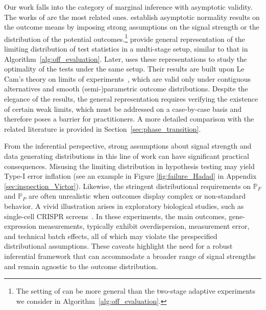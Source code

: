 \documentclass[12pt]{article}
\begin{document}
Our work falls into the category of marginal inference with asymptotic validity. The works of \citet{Zhang2020,Hadad2021,adusumilli2023optimal,Hirano2023} are the most related ones. \citet{Zhang2020,Hadad2021} establish asymptotic normality results on the outcome means by imposing strong assumptions on the signal strength or the distribution of the potential outcomes.\footnote{The setting of \citet{Zhang2020,Hadad2021} can be more general than the two-stage adaptive experiments we consider in Algorithm~\ref{alg:off_evaluation}.} \citet{Hirano2023} provide general representation of the limiting distribution of test statistics 
in a multi-stage setup, similar to that in Algorithm~\ref{alg:off_evaluation}. Later, \citet{adusumilli2023optimal} uses these representations to study the optimality of the tests under the same setup. Their results are built upon Le Cam's theory on limits of experiments~\citep{le1972limits}, 
which are valid only under contiguous alternatives and smooth (semi-)parametric outcome distributions. Despite the elegance of the results, the general representation requires verifying the existence of certain weak limits, which must be addressed on a case-by-case basis and therefore poses a barrier for practitioners. A more detailed comparison with the related literature is provided in Section~\ref{sec:phase_transition}.

From the inferential perspective, strong assumptions about signal strength and data generating distributions in this line of work can have significant practical consequences. 
Misusing the limiting distribution in hypothesis testing may yield Type-I error inflation (see an example in Figure \ref{fig:failure_Hadad} in Appendix \ref{sec:inspection_Victor}). Likewise, the stringent distributional requirements on $\mathbb{P}_{F}$ and $\mathbb{P}_{P}$ are often unrealistic when outcomes display complex or non-standard behavior. A vivid illustration arises in exploratory biological studies, such as single-cell CRISPR screens~\citep{dixit2016perturb,gasperini2019genome}. In these experiments, the main outcomes, gene-expression measurements, typically exhibit overdispersion, measurement error, and technical batch effects, all of which may violate the prespecified distributional assumptions. These caveats highlight the need for a robust inferential framework that can accommodate a broader range of signal strengths and remain agnostic to the outcome distribution.
\end{document}

